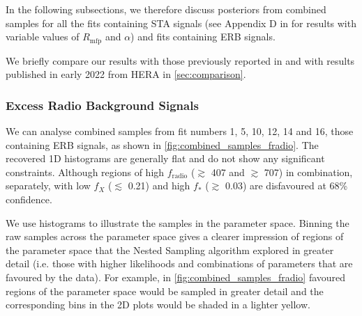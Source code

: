In the following subsections, we therefore discuss posteriors from combined samples for all the fits containing STA signals (see Appendix D in \cite{Bevins_SARAS2_2022} for results with variable values of $R_\mathrm{mfp}$ and $\alpha$) and fits containing ERB signals.

We briefly compare our results with those previously reported in \cite{Singh_saras2_2017, Singh_saras2_2018} and with results published in early 2022 from HERA \cite{HERA_2022b} in \cref{sec:comparison}.

\subsubsection{Excess Radio Background Signals}

We can analyse combined samples from fit numbers 1, 5, 10, 12, 14 and 16, those containing ERB signals, as shown in \cref{fig:combined_samples_fradio}. The recovered 1D histograms are generally flat and do not show any significant constraints. Although regions of high $f_\mathrm{radio}$ ($\gtrsim$ 407 and $\gtrsim$ 707)
in combination, separately, with low $f_X$ ($\lesssim$ 0.21) and high $f_*$ ($\gtrsim$ 0.03) are disfavoured at 68\% confidence. %

We use histograms to illustrate the samples in the parameter space. %
Binning the raw samples across the parameter space gives a clearer impression of regions of the parameter space that the Nested Sampling algorithm explored in greater detail (i.e. those with higher likelihoods and combinations of parameters that are favoured by the data). For example, in \cref{fig:combined_samples_fradio} favoured regions of the parameter space would be sampled in greater detail and the corresponding bins in the 2D plots would be shaded in a lighter yellow.

